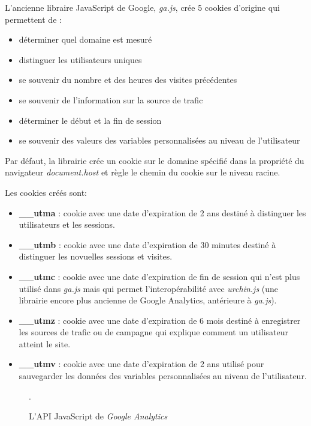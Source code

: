 L'ancienne libraire JavaScript de Google, \textit{ga.js}, crée 5 cookies d'origine qui permettent de :
\begin{itemize}
  \item déterminer quel domaine est mesuré
  \item distinguer les utilisateurs uniques
  \item se souvenir du nombre et des heures des visites précédentes
  \item se souvenir de l'information sur la source de trafic
  \item déterminer le début et la fin de session
  \item se souvenir des valeurs des variables personnalisées au niveau de l'utilisateur
\end{itemize}

Par défaut, la librairie crée un cookie sur le domaine spécifié dans la propriété du navigateur \textit{document.host} et règle le chemin du cookie sur le niveau racine.

Les cookies créés sont:
\begin{itemize}
  \item \textbf{\_\_utma} : cookie avec une date d'expiration de 2 ans destiné à distinguer les utilisateurs et les sessions.
  \item \textbf{\_\_utmb} : cookie avec une date d'expiration de 30 minutes destiné à distinguer les novuelles sessions et visites.
  \item \textbf{\_\_utmc} : cookie avec une date d'expiration de fin de session qui n'est plus utilisé dans \textit{ga.js} mais qui permet l'interopérabilité avec \textit{urchin.js} (une librairie encore plus ancienne de Google Analytics, antérieure à \textit{ga.js}).
  \item \textbf{\_\_utmz} : cookie avec une date d'expiration de 6 mois destiné à enregistrer les sources de trafic ou de campagne qui explique comment un utilisateur atteint le site.
  \item \textbf{\_\_utmv} : cookie avec une date d'expiration de 2 ans utilisé pour sauvegarder les données des variables personnalisées au niveau de l'utilisateur.
\end{itemize}

\begin{figure}[h]
	\centering
	
	\caption{\label{js_google_analytics}L'API JavaScript de \textit{Google Analytics}}.
\end{figure}

